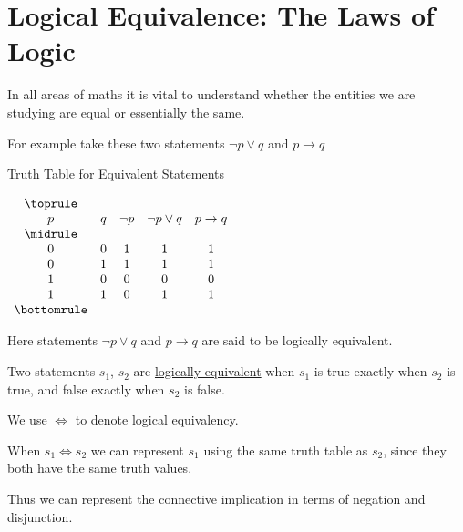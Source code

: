 \documentclass[../../../../main.tex]{subfiles}
\begin{document}
\section{Logical Equivalence: The Laws of Logic}

In all areas of maths it is vital to understand whether the
entities we are studying are equal or essentially the same.

\newcommand\negporq{\neg p \lor q}
\newcommand\ptoq{p \to q}

For example take these two statements $\negporq$
and $\ptoq$

\begin{table}
    \centering
    \caption*{Truth Table for Equivalent Statements}
    \label{tbl:equivalent-statements}
    \begin{subtable}{\linewidth}
        \centering
        $\begin{array}{ *{5}{c} }
            \toprule \\
            p & q & \neg p & \negporq & \ptoq \\
            \midrule \\
            0 & 0 & 1 & 1 & 1 \\
            0 & 1 & 1 & 1 & 1 \\
            1 & 0 & 0 & 0 & 0 \\
            1 & 1 & 0 & 1 & 1 \\
            \bottomrule
        \end{array}$
    \end{subtable}%
\end{table}

Here statements $\negporq$ and $\ptoq$
are said to be logically equivalent.

\begin{definition}
    Two statements $s_1$, $s_2$ are \underline{logically equivalent} when $s_1$ is true
    exactly when $s_2$ is true, and false exactly when $s_2$ is false.
\end{definition}

We use $\iff$ to denote logical equivalency.

When $s_1 \iff s_2$ we can represent $s_1$ using the same truth table as $s_2$,
since they both have the same truth values.

Thus we can represent the connective implication in terms of negation and disjunction.
\end{document}

